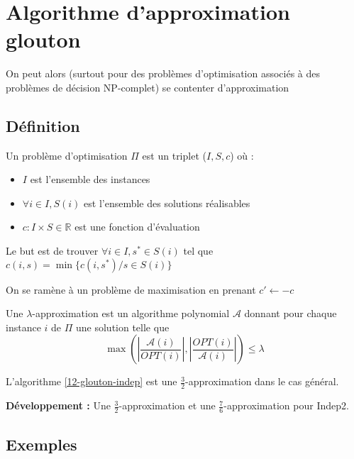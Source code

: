 \section{Algorithme d'approximation glouton}

On peut alors (surtout pour des problèmes d'optimisation associés à des problèmes de décision NP-complet) se contenter d'approximation

\subsection{Définition}

\begin{definition}
	Un problème d'optimisation $\Pi$ est un triplet ($I, S, c$) où :
	\begin{itemize}
		\item $I$ est l'ensemble des instances
		\item $\forall i \in I, S(i)$ est l'ensemble des solutions réalisables
		\item $c : I\times S \in \mathbb R$ est une fonction d'évaluation 
	\end{itemize}
	Le but est de trouver $\forall i \in I, s^* \in S(i)$ tel que $c(i,s) = \min \{c(i, s^*) / s \in S(i)\}$
\end{definition}

\begin{rem}
	On se ramène à un problème de maximisation en prenant $c' \gets -c$
\end{rem}

\begin{definition}
	Une $\lambda$-approximation est un algorithme polynomial $\mathcal A$ donnant pour chaque instance $i$ de $\Pi$ une solution telle que 	
	$$\max\left(\left| \dfrac{\mathcal A(i)}{OPT(i)} \right|, \left| \dfrac{OPT(i)}{\mathcal A(i)} \right|\right) \leq \lambda$$
\end{definition}

\begin{example}
	L'algorithme \ref{12-glouton-indep} est une $\frac{3}{2}$-approximation dans le cas général.
\end{example}

\textbf{Développement :} Une $\frac{3}{2}$-approximation et une $\frac{7}{6}$-approximation pour Indep2.

\subsection{Exemples}

